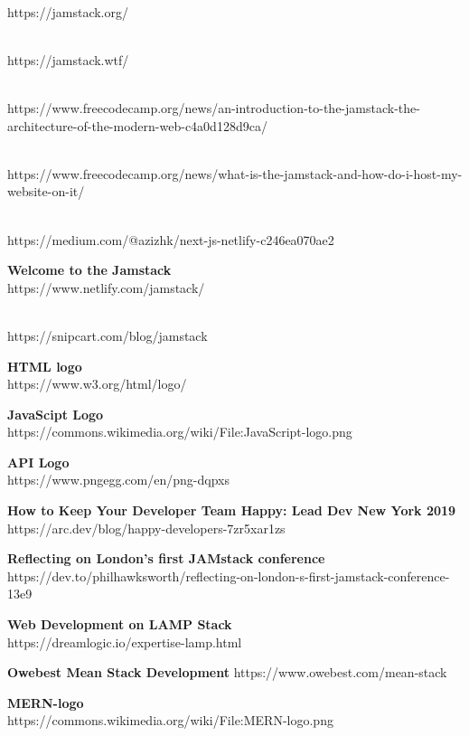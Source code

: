 \documentclass[12pt,a4paper,oneside]{report}
\begin{document}
\renewcommand{\bibname}{\uppercase{REFERENCES}}
\begin{thebibliography}{999}

\\https://jamstack.org/

\\https://jamstack.wtf/

\\https://www.freecodecamp.org/news/an-introduction-to-the-jamstack-the-architecture-of-the-modern-web-c4a0d128d9ca/

\\https://www.freecodecamp.org/news/what-is-the-jamstack-and-how-do-i-host-my-website-on-it/

\\https://medium.com/@azizhk/next-js-netlify-c246ea070ae2

 {\textbf{Welcome to the Jamstack}}\\https://www.netlify.com/jamstack/

\\
https://snipcart.com/blog/jamstack

\textbf{HTML logo}\\
https://www.w3.org/html/logo/

\textbf{JavaScipt Logo}\\
https://commons.wikimedia.org/wiki/File:JavaScript-logo.png

\textbf{API Logo}\\
https://www.pngegg.com/en/png-dqpxs

\textbf{How to Keep Your Developer Team Happy: Lead Dev New York 2019}\\
https://arc.dev/blog/happy-developers-7zr5xar1zs

\textbf{Reflecting on London’s first JAMstack conference}\\
https://dev.to/philhawksworth/reflecting-on-london-s-first-jamstack-conference-13e9

\textbf{Web Development on LAMP Stack}\\
https://dreamlogic.io/expertise-lamp.html

\textbf{Owebest Mean Stack Development}
https://www.owebest.com/mean-stack

\textbf{MERN-logo}\\
https://commons.wikimedia.org/wiki/File:MERN-logo.png


\end{thebibliography}
\end{document}
